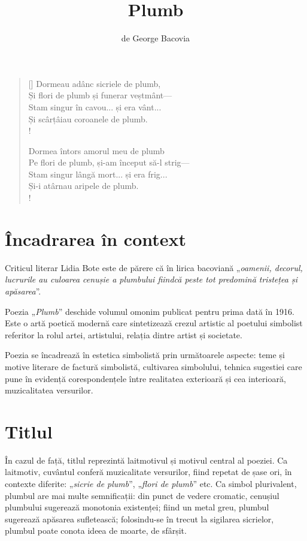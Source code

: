\documentclass{article}
\title{Plumb}
\author{de George Bacovia}
\date{}
\newcommand{\qu}[1]{„\emph{#1}”}
\begin{document}
\maketitle

\settowidth{\versewidth}{Pe flori de plumb, și-am început să-l strig}
\begin{verse}[\versewidth]
Dormeau adânc sicriele de plumb, \\
Și flori de plumb și funerar veștmânt— \\
Stam singur în cavou... și era vânt... \\
Și scârțâiau coroanele de plumb. \\!

Dormea întors amorul meu de plumb \\
Pe flori de plumb, și-am început să-l strig— \\
Stam singur lângă mort... și era frig... \\
Și-i atârnau aripele de plumb. \\!
\end{verse}

\section{Încadrarea în context}
Criticul literar Lidia Bote este de părere că în lirica bacoviană \qu{oamenii, decorul, lucrurile au culoarea cenușie a plumbului fiindcă peste tot predomină tristețea și apăsarea}.

Poezia \qu{Plumb} deschide volumul omonim publicat pentru prima dată în 1916. Este o artă poetică modernă care sintetizează crezul artistic al poetului simbolist referitor la rolul artei, artistului, relația dintre artist și societate.

Poezia se încadrează în estetica simbolistă prin următoarele aspecte: teme și motive literare de factură simbolistă, cultivarea simbolului, tehnica sugestiei care pune în evidență corespondențele între realitatea exterioară și cea interioară, muzicalitatea versurilor.

\section{Titlul}
În cazul de față, titlul reprezintă laitmotivul și motivul central al poeziei. Ca laitmotiv, cuvântul conferă muzicalitate versurilor, fiind repetat de șase ori, în contexte diferite: \qu{sicrie de plumb}, \qu{flori de plumb} etc. Ca simbol plurivalent, plumbul are mai multe semnificații: din punct de vedere cromatic, cenușiul plumbului sugerează monotonia existenței; fiind un metal greu, plumbul sugerează apăsarea sufletească; folosindu-se în trecut la sigilarea sicrielor, plumbul poate conota ideea de moarte, de sfârșit.
\end{document}
